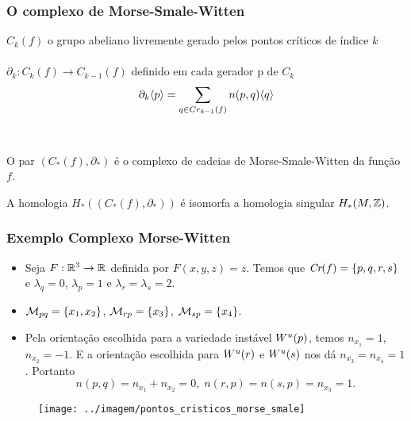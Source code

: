 \documentclass{beamer}
\begin{document}
	\begin{frame}
		\frametitle{O complexo de Morse-Smale-Witten}
		\begin{definicao}
			$C_{k}(f)$ o grupo abeliano livremente gerado pelos pontos críticos de índice $k$ 
			\\~\\
			$\partial_{k}: C_{k}(f)\to C_{k-1}(f)$ definido em cada gerador p de $C_{k}$
			$$
			\partial_{k}\langle p\rangle=\sum_{q \in Cr_{k-1}(f)}n(p,q)\langle q\rangle
			$$
			\\~\\
			O par $(C_{*}(f), \partial_{*})$ é o complexo de cadeias de Morse-Smale-Witten  da função $f$.
		\end{definicao}
		
		
		\begin{teorema}
			 A homologia $H_{*}((C_{*}(f), \partial_{*})) $ é isomorfa a homologia singular $H_{*}(M, \mathbb{Z})$.
		\end{teorema}
	\end{frame}
	
	
	
	\begin{frame}
		
		\frametitle{Exemplo Complexo Morse-Witten}
		
		\begin{minipage}[t]{0.5\linewidth}
			
			\begin{itemize}
				\item Seja $F:\mathbb{R}^{3} \to \mathbb{R}^{}$ definida por $F(x, y, z) = z$. Temos que $\textit{Cr}(f) = \{p,q,r,s\}$ e $\lambda_{q} = 0$, $\lambda_{p} = 1$ e $\lambda_{r}=\lambda_{s} = 2$. 
				
				\item $\mathcal{M}_{pq}=\{x_{1}, x_{2}\}$, $\mathcal{M}_{rp} = \{ x_{3}\}$, $\mathcal{M}_{sp} = \{x_{4} \}$.
				
				\item Pela orientação escolhida para a variedade instável $W^{u}(p)$, temos $n_{x_{1}}=1$, $n_{x_{2}} = -1$. E a orientação escolhida para $W^{u}(r)$ e $W^{u}(s)$ nos dá $n_{x_{3}} =n_{x_{4}}= 1$. Portanto 
				$$
				n(p,q) = n_{x_{1}}+n_{x_{2}} = 0,\; n(r,p) = n(s,p)=n_{x_{3}}= 1. 
				$$			
			\end{itemize}
		\end{minipage}
		\hfill%
			\begin{minipage}[t]{0.4\linewidth}
				\begin{figure}
					\centering
					\textbf{}\par
					\texttt{[image: ../imagem/pontos\_cristicos\_morse\_smale]}
				\end{figure}
				
			\end{minipage}
	
	\end{frame}
	
\end{document}
